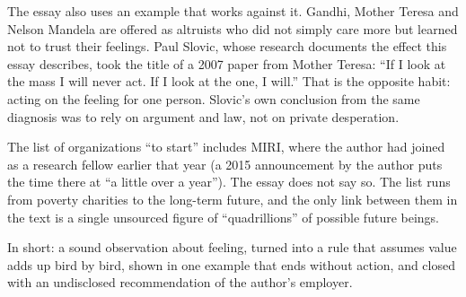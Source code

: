 \begin{afterword}
The essay also uses an example that works against it. Gandhi, Mother Teresa and Nelson Mandela are offered as altruists who did not simply care more but learned not to trust their feelings. Paul Slovic, whose research documents the effect this essay describes, took the title of a 2007 paper from Mother Teresa: ``If I look at the mass I will never act. If I look at the one, I will.'' That is the opposite habit: acting on the feeling for one person. Slovic's own conclusion from the same diagnosis was to rely on argument and law, not on private desperation.

The list of organizations ``to start'' includes MIRI, where the author had joined as a research fellow earlier that year (a 2015 announcement by the author puts the time there at ``a little over a year''). The essay does not say so. The list runs from poverty charities to the long-term future, and the only link between them in the text is a single unsourced figure of ``quadrillions'' of possible future beings.

In short: a sound observation about feeling, turned into a rule that assumes value adds up bird by bird, shown in one example that ends without action, and closed with an undisclosed recommendation of the author's employer.
\end{afterword}
